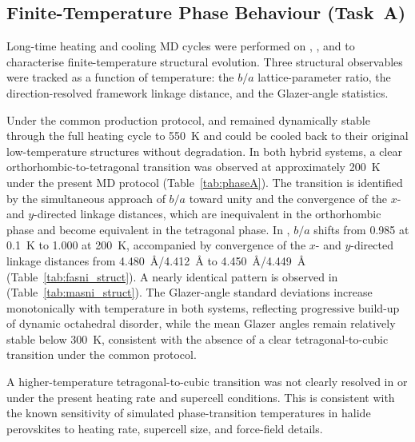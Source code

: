 \subsection{Finite-Temperature Phase Behaviour (Task~A)}
\label{subsec:results_phaseA}

Long-time heating and cooling MD cycles were performed on \CsSnI{},
\FASnI{}, and \MASnI{} to characterise finite-temperature structural
evolution.
Three structural observables were tracked as a function of
temperature: the $b/a$ lattice-parameter ratio, the direction-resolved
 framework linkage distance, and the Glazer-angle
statistics.

Under the common production protocol, \FASnI{} and \MASnI{} remained
dynamically stable through the full heating cycle to \SI{550}{K}
and could be cooled back to their original low-temperature structures
without degradation.
In both hybrid systems, a clear orthorhombic-to-tetragonal transition
was observed at approximately \SI{200}{K} under the present MD
protocol (Table~\ref{tab:phaseA}).
The transition is identified by the simultaneous approach of $b/a$
toward unity and the convergence of the $x$- and $y$-directed
 linkage distances, which are inequivalent in the
orthorhombic phase and become equivalent in the tetragonal phase.
In \FASnI{}, $b/a$ shifts from 0.985 at \SI{0.1}{K} to 1.000 at
\SI{200}{K}, accompanied by convergence of the $x$- and $y$-directed
linkage distances from
\SI{4.480}{\angstrom}/\SI{4.412}{\angstrom}
to
\SI{4.450}{\angstrom}/\SI{4.449}{\angstrom}
(Table~\ref{tab:fasni_struct}).
A nearly identical pattern is observed in \MASnI{}
(Table~\ref{tab:masni_struct}).
The Glazer-angle standard deviations increase monotonically with
temperature in both systems, reflecting progressive build-up of
dynamic octahedral disorder, while the mean Glazer angles remain
relatively stable below \SI{300}{K}, consistent with the absence of
a clear tetragonal-to-cubic transition under the common protocol.

A higher-temperature tetragonal-to-cubic transition was not clearly
resolved in \FASnI{} or \MASnI{} under the present heating rate
and supercell conditions.
This is consistent with the known sensitivity of simulated
phase-transition temperatures in halide perovskites to heating rate,
supercell size, and force-field details.\cite{fransson2023phase}


